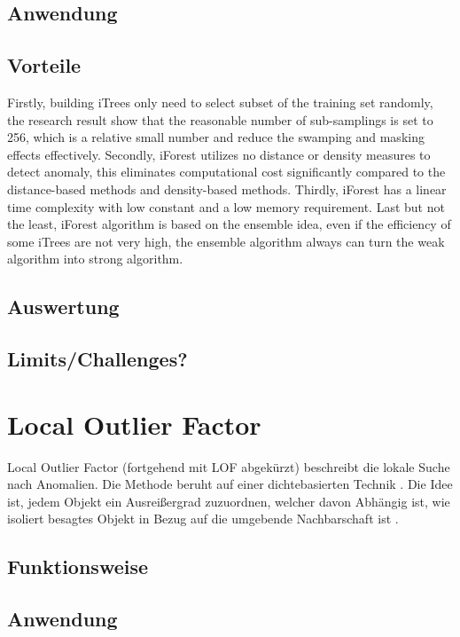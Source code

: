 \subsection{Anwendung}


\subsection{Vorteile}
Firstly, building iTrees only need to select subset of the training set randomly, the research result show that the reasonable number of
sub-samplings is set to 256, which is a relative small number and reduce the swamping and masking effects effectively. Secondly, iForest utilizes no distance or density measures to detect anomaly, this eliminates computational cost significantly compared to the distance-based methods and density-based methods. Thirdly, iForest has a linear time complexity with low constant and a low memory
requirement. Last but not the least, iForest algorithm is based on the ensemble idea, even if the efficiency of some
iTrees are not very high, the ensemble algorithm always can turn the weak algorithm into strong algorithm.

\subsection{Auswertung}
\subsection{Limits/Challenges?}

\newpage

\section{Local Outlier Factor}
Local Outlier Factor (fortgehend mit LOF abgekürzt) beschreibt die lokale Suche nach Anomalien. Die Methode beruht auf einer dichtebasierten Technik \cite{alghushairyReviewLocalOutlier2020}. Die Idee ist, jedem Objekt ein Ausreißergrad zuzuordnen, welcher davon Abhängig ist, wie isoliert besagtes Objekt in Bezug auf die umgebende Nachbarschaft ist \cite{breunigLOFIdentifyingDensitybased2000}. 
\subsection{Funktionsweise}
\subsection{Anwendung}
